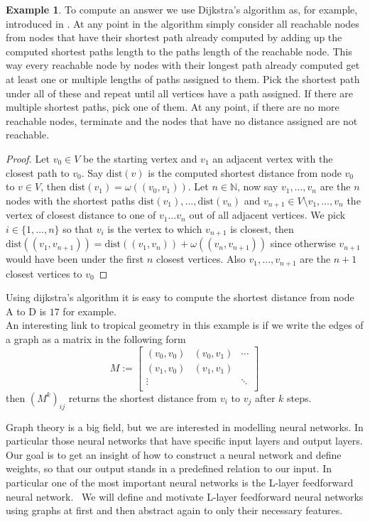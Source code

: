 \documentclass{article}
\theoremstyle{definition}
\newtheorem{example}[theorem]{Example}
\begin{document}
\begin{example}
To compute an answer we use Dijkstra's algorithm as, for example, introduced in \cite{borg2014script}. At any point in the algorithm simply consider all reachable nodes from nodes that have their shortest path already computed by adding up the computed shortest paths length to the paths length of the reachable node. This way every reachable node by nodes with their longest path already computed get at least one or multiple lengths of paths assigned to them. Pick the shortest path under all of these and repeat until all vertices have a path assigned. If there are multiple shortest paths, pick one of them. At any point, if there are no more reachable nodes, terminate and the nodes that have no distance assigned are not reachable.
\begin{proof}
Let $v_0 \in V$ be the starting vertex and $v_1$ an adjacent vertex with the closest path to $v_0$. Say $\text{dist}(v)$ is the computed shortest distance from node $v_0$ to $v \in V$, then $\text{dist}(v_1) = \omega((v_0, v_1))$. Let $n \in \mathbb{N}$, now say $v_1, \dots , v_n$ are the $n$ nodes with the shortest paths $\text{dist}(v_1), \dots , \text{dist}(v_n)$ and $v_{n+1} \in V \setminus {v_1, \dots , v_n}$ the vertex of closest distance to one of $v_1 \dots v_n$ out of all adjacent vertices. We pick $i \in \{ 1 , \dots , n \}$ so that $v_i$ is the vertex to which $v_{n+1}$ is closest, then $\text{dist}((v_1, v_{n+1})) = \text{dist}((v_1, v_{n})) + \omega((v_{n}, v_{n+1}))$ since otherwise $v_{n+1}$ would have been under the first $n$ closest vertices. Also $v_1 , \dots , v_{n+1}$ are the $n+1$  closest vertices to $v_0$
\end{proof}

Using dijkstra's algorithm it is easy to compute the shortest distance from node A to D is $17$ for example. \\
An interesting link to tropical geometry in this example is if we write the edges of a graph as a matrix in the following form
$$M := \left[ \begin{array}{rrrr}
(v_0, v_0) & (v_0, v_1) & \cdots \\
(v_1, v_0) & (v_1, v_1)  \\
\vdots &  & \ddots \\
\end{array}\right]$$
then $(M^{k})_{ij}$ returns the shortest distance from $v_i$ to $v_j$ after $k$ steps.
\end{example}

Graph theory is a big field, but we are interested in modelling neural networks. In particular those neural networks that have specific input layers and output layers. Our goal is to get an insight of how to construct a neural network and define weights, so that our output stands in a predefined relation to our input.
In particular one of the most important neural networks is the L-layer feedforward neural network. \
We will define and motivate L-layer feedforward neural networks using graphs at first and then abstract again to only their necessary features.
\end{document}
